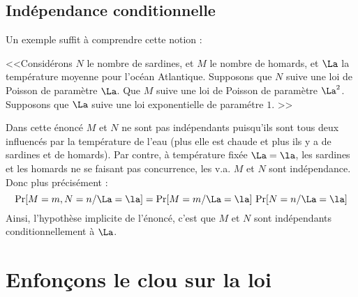 \documentclass{article}
\begin{document}
\subsection{Indépendance conditionnelle}

Un exemple suffit à comprendre cette notion : 

<<Considérons $N$ le  nombre de sardines, et $M$ le nombre de homards, et $\La$ la température moyenne pour l'océan Atlantique.   Supposons que $N$ suive une loi de Poisson de paramètre $\La$. Que $M$ suive une loi de Poisson de paramètre $\La^2$.  Supposons que $\La$ suive une loi exponentielle de paramétre $1$.     >>


Dans cette énoncé $M$ et $N$ ne sont pas indépendants puisqu'ils sont tous deux influencés par la température de l'eau (plus elle est chaude et plus ils y a de sardines et de homards). Par contre, à température fixée $\La=\la$, les sardines et les homards ne se faisant pas concurrence, les v.a. $M$ et $N$ sont indépendance.  Donc plus précisément :
$$
   \Pr[M=m, N=n / \La=\la] =\Pr[M=m / \La=\la]\, \Pr[ N=n / \La=\la] 
$$
Ainsi, l'hypothèse implicite de l'énoncé, c'est que $M$ et $N$ sont indépendants conditionnellement à $\La$. 









 



\section{Enfonçons le clou sur  la loi}
\end{document}
